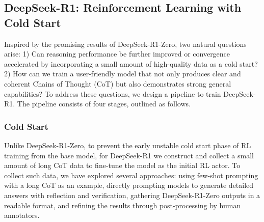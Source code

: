 \documentclass[11pt, a4paper, logo, copyright, nonumbering]{deepseek}
\newcommand{\dsri}{DeepSeek-R1}
\newcommand{\dsro}{DeepSeek-R1-Zero}
\begin{document}
\subsection{\dsri{}: Reinforcement Learning with Cold Start}
Inspired by the promising results of \dsro{}, two natural questions arise: 1) Can reasoning performance be further improved or convergence accelerated by incorporating a small amount of high-quality data as a cold start? 2) How can we train a user-friendly model that not only produces clear and coherent Chains of Thought (CoT) but also demonstrates strong general capabilities?
To address these questions, we design a pipeline to train \dsri{}. The pipeline consists of four stages, outlined as follows.


\subsubsection{Cold Start}
Unlike \dsro{}, to prevent the early unstable cold start phase of RL training from the base model, for DeepSeek-R1 we construct and collect a small amount of long CoT data to fine-tune the model as the initial RL actor.
To collect such data, we have explored several approaches: using few-shot prompting with a long CoT as an example, directly prompting models to generate detailed answers with reflection and verification, gathering \dsro{} outputs in a readable format, and refining the results through post-processing by human annotators.
\end{document}
